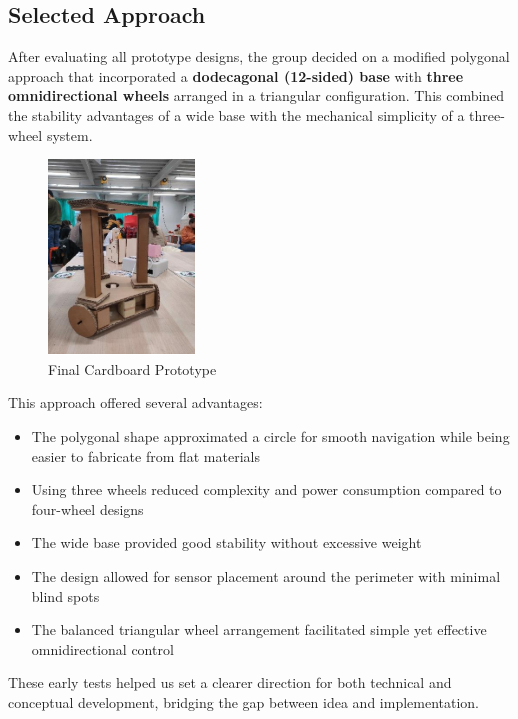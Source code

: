 \subsection{Selected Approach}

After evaluating all prototype designs, the group decided on a modified polygonal approach that incorporated a \textbf{dodecagonal (12-sided) base} with \textbf{three omnidirectional wheels} arranged in a triangular configuration. This combined the stability advantages of a wide base with the mechanical simplicity of a three-wheel system.

\begin{figure}[H]
    \centering
    \includegraphics[width=0.5\linewidth]{../ReportMovementModule/images/Aspose.Words.728084da-df58-4b9d-a372-f65cffbdb23d.006.png}
    \caption{Final Cardboard Prototype}
\end{figure}

This approach offered several advantages:
\begin{itemize}
    \item The polygonal shape approximated a circle for smooth navigation while being easier to fabricate from flat materials
    \item Using three wheels reduced complexity and power consumption compared to four-wheel designs
    \item The wide base provided good stability without excessive weight
    \item The design allowed for sensor placement around the perimeter with minimal blind spots
    \item The balanced triangular wheel arrangement facilitated simple yet effective omnidirectional control
\end{itemize}

These early tests helped us set a clearer direction for both technical and conceptual development, bridging the gap between idea and implementation.
